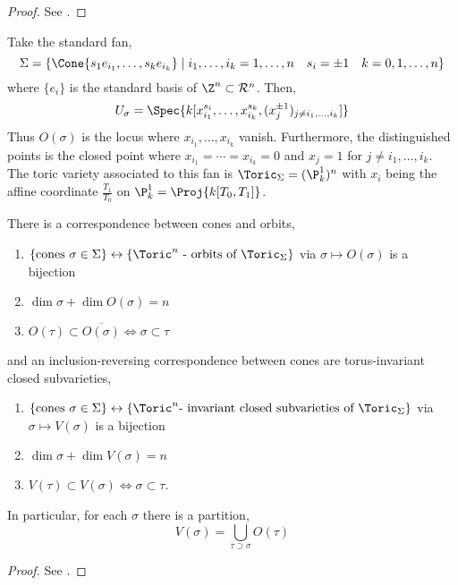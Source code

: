 \begin{proof}
See \cite[Lec. 2]{cox_lectures}.
\end{proof}

\begin{example}
Take the standard fan,
\[ \Sigma = \{ \Cone{s_{1} e_{i_1}, \dots, s_k e_{i_k}} \mid i_1, \dots, i_k = 1, \dots, n \quad s_i = \pm 1 \quad k = 0,1,\dots, n \} \] where $\{ e_i \}$ is the standard basis of $\Z^n \subset \R^n$. Then,
\[ U_\sigma = \Spec{k[x_{i_1}^{s_i}, \dots, x_{i_k}^{s_k}, (x^{\pm 1}_{j})_{j \neq i_1, \dots, i_k}]} \]
Thus $O(\sigma)$ is the locus where $x_{i_1}, \dots, x_{i_k}$ vanish.
Furthermore, the distinguished points is the closed point where $x_{i_1} = \cdots = x_{i_k} = 0$ and $x_j = 1$ for $j \neq i_1, \dots, i_k$. The toric variety associated to this fan is $\Toric_{\Sigma} = (\P^1_k)^n$ with $x_i$ being the affine coordinate $\frac{T_1}{T_0}$ on $\P^1_k = \Proj{k[T_0, T_1]}$.
\end{example}

\begin{theorem}
There is a correspondence between cones and orbits,
\begin{enumerate}
\item $\{ \text{cones } \sigma \in \Sigma \} \leftrightarrow \{ \Toric^n \text{ - orbits of } \Toric_\Sigma \}$ via $\sigma \mapsto O(\sigma)$ is a bijection
\item $\dim{\sigma} + \dim{O(\sigma)} = n$
\item $O(\tau) \subset \overline{O(\sigma)} \iff \sigma \subset \tau$
\end{enumerate}
and an inclusion-reversing correspondence between cones are torus-invariant closed subvarieties,
\begin{enumerate}
\item $\{ \text{cones } \sigma \in \Sigma \} \leftrightarrow \{ \Toric^n \text{- invariant closed subvarieties of } \Toric_\Sigma \}$ via $\sigma \mapsto V(\sigma)$ is a bijection
\item $\dim{\sigma} + \dim{V(\sigma)} = n$
\item $V(\tau) \subset V(\sigma) \iff \sigma \subset \tau$.
\end{enumerate}
In particular, for each $\sigma$ there is a partition,
\[ V(\sigma) = \bigcup_{\tau \supset \sigma} O(\tau) \]
\end{theorem}

\begin{proof}
See \cite[Lec. 2]{cox_lectures}.
\end{proof}

